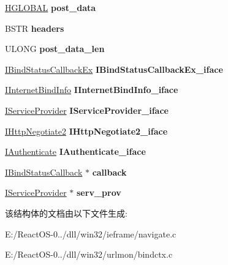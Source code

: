 \begin{DoxyCompactItemize}
\hyperlink{interfacevoid}{H\+G\+L\+O\+B\+AL} {\bfseries post\+\_\+data}
\item 
\mbox{\label{struct_bind_status_callback_a5cc67194ded01e1a5851ff6c7c865c66}} 
B\+S\+TR {\bfseries headers}
\item 
\mbox{\label{struct_bind_status_callback_a28c323a17b54206f629296344dc1e5fb}} 
U\+L\+O\+NG {\bfseries post\+\_\+data\+\_\+len}
\item 
\mbox{\label{struct_bind_status_callback_a97a81906a9041fdf7ae1fff139612069}} 
\hyperlink{interface_i_bind_status_callback_ex}{I\+Bind\+Status\+Callback\+Ex} {\bfseries I\+Bind\+Status\+Callback\+Ex\+\_\+iface}
\item 
\mbox{\label{struct_bind_status_callback_af8a35badf7fa994b1458308ab79dde09}} 
\hyperlink{interface_i_internet_bind_info}{I\+Internet\+Bind\+Info} {\bfseries I\+Internet\+Bind\+Info\+\_\+iface}
\item 
\mbox{\label{struct_bind_status_callback_acdfddcafb06a444cf446efdc83bc73b6}} 
\hyperlink{interface_i_service_provider}{I\+Service\+Provider} {\bfseries I\+Service\+Provider\+\_\+iface}
\item 
\mbox{\label{struct_bind_status_callback_a0f058b98bf51c23376ede418de87534c}} 
\hyperlink{interface_i_http_negotiate2}{I\+Http\+Negotiate2} {\bfseries I\+Http\+Negotiate2\+\_\+iface}
\item 
\mbox{\label{struct_bind_status_callback_af6b541b2427930bee441803b3c9c1489}} 
\hyperlink{interface_i_authenticate}{I\+Authenticate} {\bfseries I\+Authenticate\+\_\+iface}
\item 
\mbox{\label{struct_bind_status_callback_a470e8e99f2b85dbc7e8efb90ff70a46e}} 
\hyperlink{interface_i_bind_status_callback}{I\+Bind\+Status\+Callback} $\ast$ {\bfseries callback}
\item 
\mbox{\label{struct_bind_status_callback_a4639ad572f45553f2a8bc088d6515848}} 
\hyperlink{interface_i_service_provider}{I\+Service\+Provider} $\ast$ {\bfseries serv\+\_\+prov}
\end{DoxyCompactItemize}


该结构体的文档由以下文件生成\+:\begin{DoxyCompactItemize}
\item 
E\+:/\+React\+O\+S-\/0../dll/win32/ieframe/navigate.\+c\item 
E\+:/\+React\+O\+S-\/0../dll/win32/urlmon/bindctx.\+c\end{DoxyCompactItemize}
